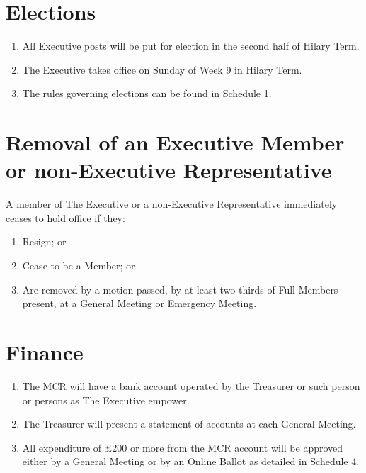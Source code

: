 \documentclass[11pt, a4paper]{article}
\begin{document}
\section{Elections}
\label{sec:elections}

\begin{enumerate}
	\item All Executive posts will be put for election in the second half of Hilary Term.
    \item The Executive takes office on Sunday of Week 9 in Hilary Term.
    \item The rules governing elections can be found in Schedule 1.
\end{enumerate}





\section{Removal of an Executive Member or non-Executive Representative}
\label{sec:removal_committee}

A member of The Executive or a non-Executive Representative immediately ceases to hold office if they:

\begin{enumerate}
	\item Resign; or
    \item Cease to be a Member; or
    \item Are removed by a motion passed, by at least two-thirds of Full Members present, at a General Meeting or Emergency Meeting.
\end{enumerate}





\section{Finance}
\label{sec:finance}

\begin{enumerate}
	\item The MCR will have a bank account operated by the Treasurer or such person or persons as The Executive empower.
    \item The Treasurer will present a statement of accounts at each General Meeting.
    \item All expenditure of \pounds200 or more from the MCR account will be approved either by a General Meeting or by an Online Ballot as detailed in Schedule 4.
\end{enumerate}
\end{document}
